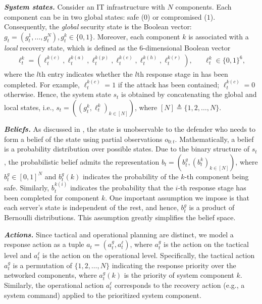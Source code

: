 \documentclass[runningheads,10pt]{llncs}
\begin{document}
\noindent\textit{\textbf{System states.}}
Consider an IT infrastructure with $N$ components. Each component can be in two global states: safe ($0$) or compromised ($1$). Consequently, the \textit{global} security state is the Boolean vector: $g_t=(g^1_t, \ldots, g_t^N),  g^k_t\in \{0, 1\}$. Moreover, each component $k$ is associated with a \textit{local} recovery state, which is defined as the 6-dimensional Boolean vector
\begin{align*}
\ell^k_t=(\ell^{k(c)}_t, \ell^{k(a)}_t, \ell^{k(p)}_t, \ell^{k(e)}_t, \ell^{k(h)}_t, \ell^{k(r)}_t), && \ell^k_t\in \{0, 1\}^6,
\end{align*}
where the $l$th entry indicates whether the $l$th response stage in  has been completed. For example, $\ell^{k(c)}_t=1$ if the attack has been contained; $\ell^{k(c)}_t=0$ otherwise. Hence, the system state $s_t$ is obtained by concatenating the global and local states, i.e., $s_t=((g_t^k,\ell_t^k)_{k\in [N]})$, where $[N] \triangleq \{1,2,\ldots, N\}$.

\noindent\textit{\textbf{Beliefs.}}
As discussed in , the state is unobservable to the defender who needs to form a belief of the state using partial observations $o_{0:t}$. Mathematically, a belief is a probability distribution over possible states. Due to the binary structure of $s_t$, the probabilistic belief admits the representation $b_t=(b_t^g, (b_t^k)_{k\in [N]})$, where $b_t^g\in [0,1]^N$ and $b_t^g(k)$ indicates the probability of the $k$-th component being safe. Similarly, $b_t^{k(i)}$ indicates the probability that the $i$-th response stage has been completed for component $k$. One important assumption we impose is that each server's state is independent of the rest, and hence, $b_t^g$ is a product of Bernoulli distributions. This assumption greatly simplifies the belief space. 

\noindent\textit{\textbf{Actions.}}
Since tactical and operational planning are distinct, we model a response action as a tuple $a_t=(a_t^g, a_t^{\ell})$, where $a_t^g$ is the action on the tactical level and $a_t^{\ell}$ is the action on the operational level. Specifically, the tactical action $a_t^g$ is a permutation of $\{1,2, \ldots, N\}$ indicating the response priority over the networked components, where $a_t^g(k)$ is the priority of system component $k$. Similarly, the operational action $a_t^{\ell}$ corresponds to the recovery action (e.g., a system command) applied to the prioritized system component.
\end{document}
